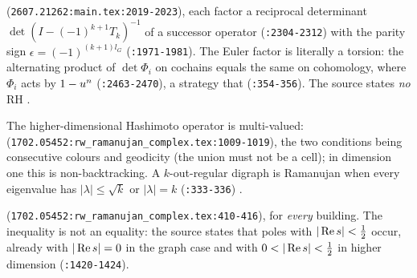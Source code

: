 \begin{citedfact}
\label{cit:kangyu-alternating}
\sloppy
{\small\texttt{}}
(\texttt{2607.21262:main.tex:2019-2023}), each factor a reciprocal determinant
$\det(I-(-1)^{k+1}T_k)^{-1}$ of a successor operator (\texttt{:2304-2312}) with
the parity sign $\epsilon = (-1)^{(k+1)l_G}$ (\texttt{:1971-1981}). The Euler
factor is literally a torsion: the alternating product of $\det\Phi_i$ on %
cochains equals the same on cohomology, where $\Phi_i$ acts by $1-u^n$ %
(\texttt{:2463-2470}), a strategy that
{\small\texttt{}}
(\texttt{:354-356}). The source states \emph{no} RH \cite{kangyu2026zeta}.
\end{citedfact}

\begin{citedfact}
\label{cit:llp-geodesic-flow}
\sloppy
The higher-dimensional Hashimoto operator is multi-valued:
{\small\texttt{}}
(\texttt{1702.05452:rw\_ramanujan\_complex.tex:1009-1019}), the two conditions
being consecutive colours and geodicity (the union must not be a cell); in
dimension one this is non-backtracking. A $k$-out-regular digraph is Ramanujan
when every eigenvalue has $|\lambda|\le\sqrt k$ or $|\lambda| = k$
(\texttt{:333-336}) \cite{lubetzky2017random}.
\end{citedfact}

\begin{citedfact}
\label{cit:llp-one-sided-rh}
\sloppy
{\small\texttt{}}
(\texttt{1702.05452:rw\_ramanujan\_complex.tex:410-416}), for \emph{every}
building. The inequality is not an equality: the source states that poles with
$|\operatorname{Re} s|<\frac12$ occur, already with $|\operatorname{Re} s| = 0$ in the graph case and with
$0<|\re s|<\frac12$ in higher dimension (\texttt{:1420-1424}).
\end{citedfact}

